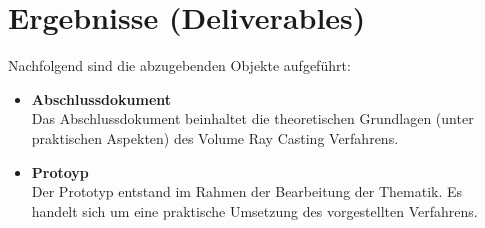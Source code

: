 \section{Ergebnisse (Deliverables)}
\label{sec:deliverables}

Nachfolgend sind die abzugebenden Objekte aufgeführt:
\begin{itemize}
    \item \textbf{Abschlussdokument} \\
        Das Abschlussdokument beinhaltet die theoretischen Grundlagen
        (unter praktischen Aspekten) des Volume Ray Casting Verfahrens.
    \item \textbf{Protoyp} \\
        Der Prototyp entstand im Rahmen der Bearbeitung der Thematik. Es
        handelt sich um eine praktische Umsetzung des vorgestellten
        Verfahrens.
\end{itemize}
